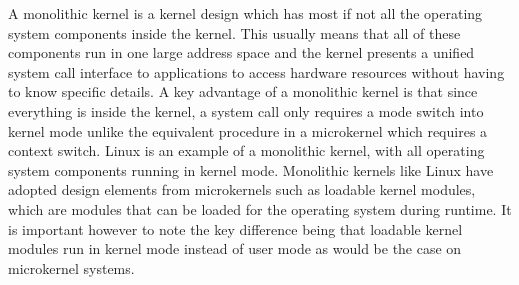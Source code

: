 \documentclass[literature_review.tex]{subfiles}
\begin{document}
A monolithic kernel is a kernel design which has most if not all the operating system components inside the kernel. This usually means that all of these components run in one large address space and the kernel presents a unified system call interface to applications to access hardware resources without having to know specific details. A key advantage of a monolithic kernel is that since everything is inside the kernel, a system call only requires a mode switch into kernel mode unlike the equivalent procedure in a microkernel which requires a context switch. Linux is an example of a monolithic kernel, with all operating system components running in kernel mode. Monolithic kernels like Linux have adopted design elements from microkernels such as loadable kernel modules, which are modules that can be loaded for the operating system during runtime. It is important however to note the key difference being that loadable kernel modules run in kernel mode instead of user mode as would be the case on microkernel systems. 
\end{document}
